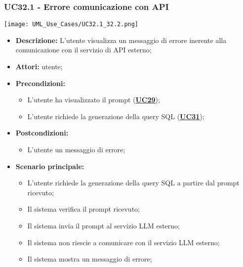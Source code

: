 \subsubsection{UC32.1 - Errore comunicazione con API}
\label{sec:UC32.1}
\texttt{[image: UML\_Use\_Cases/UC32.1\_32.2.png]}
\begin{itemize}
	\item \textbf{Descrizione:} L'utente visualizza un messaggio di errore inerente alla comunicazione con il servizio di API esterno;
	\item \textbf{Attori:} utente;
	\item \textbf{Precondizioni:} 
	\begin{itemize}
		\item L'utente ha visualizzato il prompt (\hyperref[sec:UC29]{\textbf{UC29}});
		\item L'utente richiede la generazione della query SQL (\hyperref[sec:UC31]{\textbf{UC31}});
	\end{itemize}
	\item \textbf{Postcondizioni:} 
	\begin{itemize}
		\item L'utente un messaggio di errore;
	\end{itemize}
	\item \textbf{Scenario principale:}
	\begin{itemize}
		\item L'utente richiede la generazione della query SQL a partire dal prompt ricevuto;
		\item Il sistema verifica il prompt ricevuto;
		\item Il sistema invia il prompt al servizio LLM esterno;
		\item Il sistema non riescie a comunicare con il servizio LLM esterno;
		\item Il sistema mostra un messaggio di errore;
	\end{itemize}
\end{itemize}

